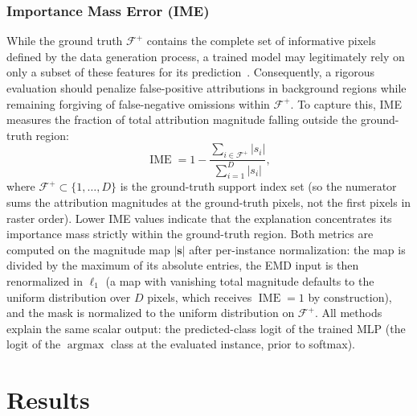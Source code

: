 \documentclass[pdflatex,sn-mathphys-num]{sn-jnl}
\theoremstyle{thmstyleone}
\theoremstyle{thmstyletwo}%
\theoremstyle{thmstylethree}%
\begin{document}
\subsubsection{Importance Mass Error (IME)}
While the ground truth $\mathcal{F}^+$ contains the complete set of informative pixels defined by the data generation process, a trained model may legitimately rely on only a subset of these features for its prediction~\cite{clark2024, arras2022}. Consequently, a rigorous evaluation should penalize false-positive attributions in background regions while remaining forgiving of false-negative omissions within $\mathcal{F}^+$. To capture this, IME measures the fraction of total attribution magnitude falling outside the ground-truth region:
\begin{equation}
    \operatorname{IME} = 1 - \frac{\sum_{i \in \mathcal{F}^+} |s_i|}{\sum_{i=1}^{D} |s_i|},
\end{equation}
where $\mathcal{F}^+ \subset \{1, \dots, D\}$ is the ground-truth support index set (so the numerator sums the attribution magnitudes at the ground-truth pixels, not the first pixels in raster order). Lower IME values indicate that the explanation concentrates its importance mass strictly within the ground-truth region. Both metrics are computed on the magnitude map $|\mathbf{s}|$ after per-instance normalization: the map is divided by the maximum of its absolute entries, the EMD input is then renormalized in $\ell_1$ (a map with vanishing total magnitude defaults to the uniform distribution over $D$ pixels, which receives $\operatorname{IME} = 1$ by construction), and the mask is normalized to the uniform distribution on $\mathcal{F}^+$. All methods explain the same scalar output: the predicted-class logit of the trained MLP (the logit of the $\operatorname{argmax}$ class at the evaluated instance, prior to softmax).

\section{Results}\label{sec2}\label{sec:results}
\end{document}
